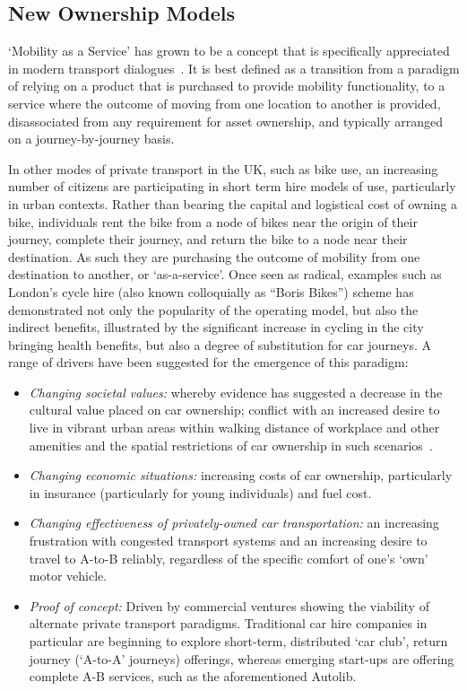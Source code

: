 \documentclass[b5paper,10pt]{article}
\begin{document}
\subsection{New Ownership Models}

`Mobility as a Service' has grown to be a concept that is specifically
appreciated in modern transport dialogues~\citep{tscatapult:2016}. It
is best defined as a transition from a paradigm of relying on a
product that is purchased to provide mobility functionality, to a
service where the outcome of moving from one location to another is
provided, disassociated from any requirement for asset ownership, and
typically arranged on a journey-by-journey basis.

In other modes of private transport in the UK, such as bike use, an
increasing number of citizens are participating in short term hire
models of use, particularly in urban contexts. Rather than bearing the
capital and logistical cost of owning a bike, individuals rent the
bike from a node of bikes near the origin of their journey, complete
their journey, and return the bike to a node near their
destination. As such they are purchasing the outcome of mobility from
one destination to another, or `as-a-service'. Once seen as radical,
examples such as London’s cycle hire (also known colloquially as
``Boris Bikes'') scheme has demonstrated not only the popularity of
the operating model, but also the indirect benefits, illustrated by
the significant increase in cycling in the city bringing health
benefits, but also a degree of substitution for car journeys. A range
of drivers have been suggested for the emergence of this paradigm:

\begin{itemize}
\item {\emph{Changing societal values:}} whereby evidence has
suggested a decrease in the cultural value placed on car ownership;
conflict with an increased desire to live in vibrant urban areas
within walking distance of workplace and other amenities and the
spatial restrictions of car ownership in such
scenarios~\citep{jenks+burgess:2011}.
\item {\emph{Changing economic situations:}} increasing costs of car
ownership, particularly in insurance (particularly for young
individuals) and fuel cost.
\item {\emph{Changing effectiveness of privately-owned car
transportation:}} an increasing frustration with congested transport
systems and an increasing desire to travel to A-to-B reliably,
regardless of the specific comfort of one's `own' motor vehicle.
\item {\emph{Proof of concept:}} Driven by commercial ventures showing
the viability of alternate private transport paradigms. Traditional
car hire companies in particular are beginning to explore short-term,
distributed `car club', return journey (`A-to-A' journeys) offerings,
whereas emerging start-ups are offering complete A-B services, such as
the aforementioned Autolib.
\end{itemize}
\end{document}
